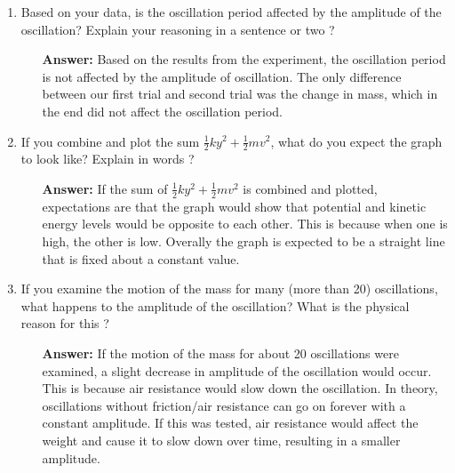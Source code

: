 

\begin{enumerate}
	\item {Based on your data, is the oscillation period affected by the amplitude of the oscillation? Explain your reasoning in a sentence or two ?}
	\begin{enumerate}
		\item[\textbf{Answer: }] {Based on the results from the experiment, the oscillation period is not affected by the amplitude of oscillation. The only difference between our first trial and second trial was the change in mass, which in the end did not affect the oscillation period.}
	\end{enumerate}
	\item {If you combine and plot the sum $\frac{1}{2}ky^2 + \frac{1}{2}mv^2$, what do you expect the graph to look like? Explain in words ?}
	\begin{enumerate}
		\item[\textbf{Answer: }] {If the sum of $\frac{1}{2}ky^2 + \frac{1}{2}mv^2$ is combined and plotted, expectations are that the graph would show that potential and kinetic energy levels would be opposite to each other. This is because when one is high, the other is low. Overally the graph is expected to be a straight line that is fixed about a constant value.}
	\end{enumerate}
	\item {If you examine the motion of the mass for many (more than 20) oscillations, what happens to the amplitude of the oscillation? What is the physical reason for this ?}
	\begin{enumerate}
		\item[\textbf{Answer: }] {If the motion of the mass for about 20 oscillations were examined, a slight decrease in amplitude of the oscillation would occur. This is because air resistance would slow down the oscillation. In theory, oscillations without friction/air resistance can go on forever with a constant  amplitude. If this was tested, air resistance would affect the weight and cause it to slow down over time, resulting in a smaller amplitude.}
	\end{enumerate}
\end{enumerate}

